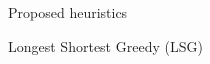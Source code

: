 \documentclass[10 pt]{beamer}
\begin{document}
\begin{section}{Proposed heuristics}
\begin{frame}{Longest Shortest Greedy (LSG)}
\begin{itemize}
  \end{itemize}

\end{frame}

% 
%     
%   
%   
%     
%   
%   
%   
% 
%   
%   

\end{section}
\end{document}
